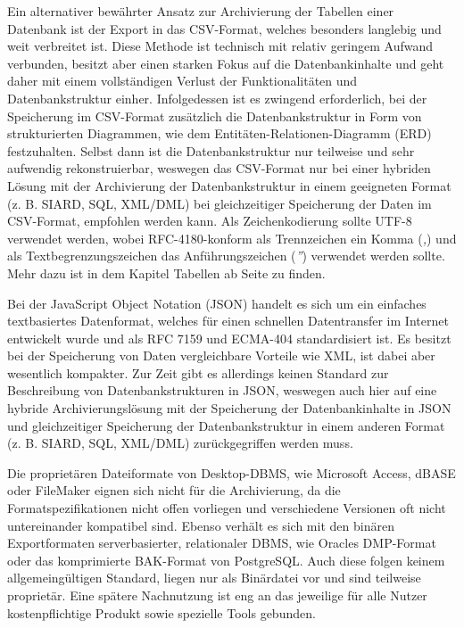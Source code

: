 Ein alternativer bewährter Ansatz zur Archivierung der Tabellen einer Datenbank ist der Export in das CSV-Format, welches besonders langlebig und weit verbreitet ist. Diese Methode ist technisch mit relativ geringem Aufwand verbunden, besitzt aber einen starken Fokus auf die Datenbankinhalte und geht daher mit einem vollständigen Verlust der Funktionalitäten und Datenbankstruktur einher. Infolgedessen ist es zwingend erforderlich, bei der Speicherung im CSV-Format zusätzlich die Datenbankstruktur in Form von strukturierten Diagrammen, wie dem Entitäten-Relationen-Diagramm (ERD) festzuhalten. Selbst dann ist die Datenbankstruktur nur teilweise und sehr aufwendig rekonstruierbar, weswegen das CSV-Format nur bei einer hybriden Lösung mit der Archivierung der Datenbankstruktur in einem geeigneten Format (z. B. SIARD, SQL, XML/DML) bei gleichzeitiger Speicherung der Daten im CSV-Format, empfohlen werden kann. Als Zeichenkodierung sollte UTF-8 verwendet werden, wobei RFC-4180-konform als Trennzeichen ein Komma (\emph{,}) und als Textbegrenzungszeichen das Anführungszeichen (\emph{''}) verwendet werden sollte. Mehr dazu ist in dem Kapitel Tabellen ab Seite \pageref{tabellen} zu finden.

Bei der JavaScript Object Notation (JSON) handelt es sich um ein einfaches textbasiertes Datenformat, welches für einen schnellen Datentransfer im Internet entwickelt wurde und als RFC 7159 und ECMA-404 standardisiert ist. Es besitzt bei der Speicherung von Daten vergleichbare Vorteile wie XML, ist dabei aber wesentlich kompakter. Zur Zeit gibt es allerdings keinen Standard zur Beschreibung von Datenbankstrukturen in JSON, weswegen auch hier auf eine hybride Archivierungslösung mit der Speicherung der Datenbankinhalte in JSON und gleichzeitiger Speicherung der Datenbankstruktur in einem anderen Format (z. B. SIARD, SQL, XML/DML) zurückgegriffen werden muss.

Die proprietären Dateiformate von Desktop-DBMS, wie Microsoft Access, dBASE oder FileMaker eignen sich nicht für die Archivierung, da die Formatspezifikationen nicht offen vorliegen und verschiedene Versionen oft nicht untereinander kompatibel sind. Ebenso verhält es sich mit den binären Exportformaten serverbasierter, relationaler DBMS, wie Oracles DMP-Format oder das komprimierte BAK-Format von PostgreSQL. Auch diese folgen keinem allgemeingültigen Standard, liegen nur als Binärdatei vor und sind teilweise proprietär. Eine spätere Nachnutzung ist eng an das jeweilige für alle Nutzer kostenpflichtige Produkt sowie spezielle Tools gebunden.

